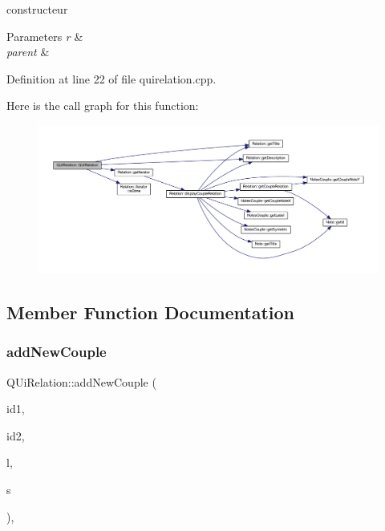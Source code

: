 constructeur 


\begin{DoxyParams}{Parameters}
{\em r} & \\
\hline
{\em parent} & \\
\hline
\end{DoxyParams}


Definition at line 22 of file quirelation.\+cpp.

Here is the call graph for this function\+:\nopagebreak
\begin{figure}[H]
\begin{center}
\leavevmode
\includegraphics[width=350pt]{class_q_ui_relation_a4d31962371f2008d814958cdf3810e14_cgraph}
\end{center}
\end{figure}


\subsection{Member Function Documentation}
\mbox{\label{class_q_ui_relation_a05ca085cba21dd2c3004f1f77dd32872}} 
\subsubsection{\texorpdfstring{add\+New\+Couple}{addNewCouple}}
{\footnotesize\ttfamily Q\+Ui\+Relation\+::add\+New\+Couple (\begin{DoxyParamCaption}\item[{Q\+String}]{id1,  }\item[{Q\+String}]{id2,  }\item[{Q\+String}]{l,  }\item[{bool}]{s }\end{DoxyParamCaption})\hspace{0.3cm}{\ttfamily [inline]}, {\ttfamily [slot]}}



